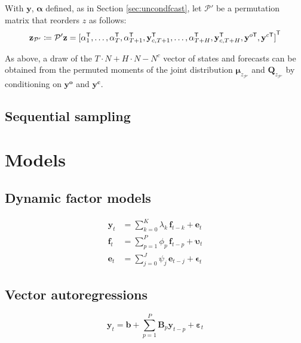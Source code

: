 \documentclass[notitlepage,a4paper,12pt]{article}
\newcommand{\transpose}[1]{{#1}^{\sf{T}}}
\begin{document}
With $\mathbf{y}$, $\boldsymbol{\alpha}$ defined, as in Section \ref{sec:uncondfcast}, let $\mathcal{P}'$ be a permutation matrix that reorders $z$ as follows:
$$
\mathbf{z}_{\mathcal{P}'} \coloneqq \mathcal{P}' \mathbf{z} =
 \transpose{[
     \alpha^{\sf{T}}_1, 
     \dots, 
     \alpha^{\sf{T}}_T, 
     \alpha^{\sf{T}}_{T+1}, 
     \mathbf{y}^{\sf{T}}_{c,T+1}, 
     \dots, 
     \alpha^{\sf{T}}_{T+H}, 
     \mathbf{y}^{\sf{T}}_{c,T+H},
     \mathbf{y}^{o\sf{T}},
     \mathbf{y}^{c\sf{T}}]}
$$

As above, a draw of the $T\!\cdot\!N + H\!\cdot\!N - N^c$ vector of states and forecasts can be obtained from the permuted moments of the joint distribution $\boldsymbol{\mu}_{z_{\mathcal{P}'}} $ and $\mathbf{Q}_{z_{\mathcal{P}'}} $ by conditioning on $\mathbf{y^{o}}$ and $\mathbf{y^c}$.

\subsection{Sequential sampling}

\section{Models}

\subsection{Dynamic factor models}

\begin{subequations}
    \label{eqn:factormodel}
    \begin{align}
        \mathbf{y}_t &= \sum_{k=0}^K \lambda_k \, \mathbf{f}_{t-k} + \mathbf{e}_t \\
        \mathbf{f}_t &= \sum_{p=1}^P \phi_p \, \mathbf{f}_{t-p} + \boldsymbol{\upsilon}_t \\
        \mathbf{e}_t &= \sum_{j=0}^J \psi_j \, \mathbf{e}_{t-j} + \boldsymbol{\epsilon}_t 
    \end{align}
\end{subequations}

\subsection{Vector autoregressions}

\begin{equation}
    \mathbf{y}_t = \mathbf{b} + \sum_{p=1}^P \mathbf{B}_p \mathbf{y}_{t-p} + \boldsymbol{\varepsilon}_t
\end{equation}
\end{document}
